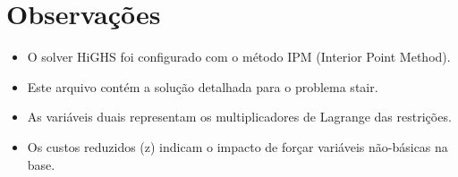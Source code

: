 \documentclass[12pt]{article}
\begin{document}
\section{Observações}

\begin{itemize}
\item O solver HiGHS foi configurado com o método IPM (Interior Point Method).
\item Este arquivo contém a solução detalhada para o problema stair.
\item As variáveis duais representam os multiplicadores de Lagrange das restrições.
\item Os custos reduzidos (z) indicam o impacto de forçar variáveis não-básicas na base.
\end{itemize}
\end{document}
